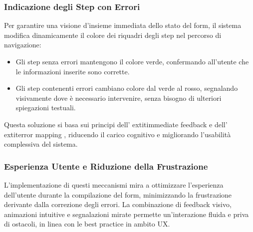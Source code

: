\subsubsection{Indicazione degli Step con Errori}
Per garantire una visione d'insieme immediata dello stato del form, il sistema modifica dinamicamente il colore dei riquadri degli step nel percorso di navigazione:
\begin{itemize}
    \item Gli step senza errori mantengono il colore verde, confermando all’utente che le informazioni inserite sono corrette.
    \item Gli step contenenti errori cambiano colore dal verde al rosso, segnalando visivamente dove è necessario intervenire, senza bisogno di ulteriori spiegazioni testuali.
\end{itemize}

Questa soluzione si basa sui principi dell’	extit{immediate feedback} e dell’	extit{error mapping} \cite{shneiderman2004}, riducendo il carico cognitivo e migliorando l’usabilità complessiva del sistema.
\newline
\subsubsection{Esperienza Utente e Riduzione della Frustrazione}
L’implementazione di questi meccanismi mira a ottimizzare l’esperienza dell’utente durante la compilazione del form, minimizzando la frustrazione derivante dalla correzione degli errori. La combinazione di feedback visivo, animazioni intuitive e segnalazioni mirate permette un’interazione fluida e priva di ostacoli, in linea con le best practice in ambito UX.


